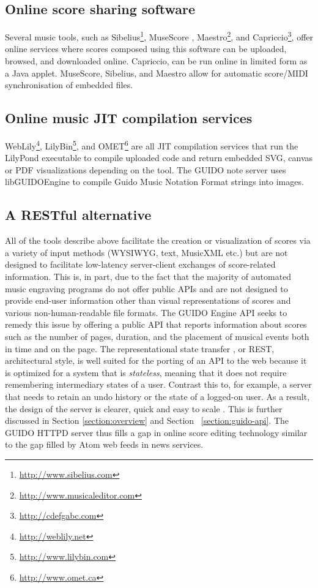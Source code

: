 \documentclass[11pt,a4paper]{article}
\newcommand{\footurl}[1]	{\footnote{\url{#1}}}
\begin{document}
\subsection{Online score sharing software}\label{subsection:sharing}
Several music tools, such as Sibelius\footurl{http://www.sibelius.com}, MuseScore \cite{musescore}, Maestro\footurl{http://www.musicaleditor.com}, and Capriccio\footurl{http://cdefgabc.com}, offer online services where scores composed using this software can be uploaded, browsed, and downloaded online.  Capriccio, can be run online in limited form as a Java applet.  MuseScore, Sibelius, and Maestro allow for automatic score/MIDI synchronisation of embedded files.
\subsection{Online music JIT compilation services}\label{subsection:jit}
WebLily\footurl{http://weblily.net}, LilyBin\footurl{http://www.lilybin.com}, and OMET\footurl{http://www.omet.ca} are all JIT compilation services that run the LilyPond executable to compile uploaded code and return embedded SVG, canvas or PDF visualizations depending on the tool.  The GUIDO note server \cite{renz98} uses libGUIDOEngine to compile Guido Music Notation Format \cite{hoos98} strings into images.
\subsection{A RESTful alternative}\label{subsection:restful}

All of the tools describe above facilitate the creation or visualization of scores via a variety of input methods (WYSIWYG, text, MusicXML etc.) but are not designed to facilitate low-latency server-client exchanges of score-related information.  This is, in part, due to the fact that the majority of automated music engraving programs do not offer public APIs and are not designed to provide end-user information other than visual representations of scores and various non-human-readable file formats.  The GUIDO Engine API \cite{Dau09a}\cite{guidolib1.52} seeks to remedy this issue by offering a public API that reports information about scores such as the number of pages, duration, and the placement of musical events both in time and on the page.  The representational state transfer \cite{Fielding00}, or REST, architectural style, is well suited for the porting of an API to the web because it is optimized for a system that is \emph{stateless}, meaning that it does not require remembering intermediary states of a user.  Contrast this to, for example, a server that needs to retain an undo history or the state of a logged-on user.  As a result, the design of the server is clearer, quick and easy to scale \cite{richardson2008restful}.  This is further discussed in Section \ref{section:overview} and Section ~\ref{section:guido-api}.  The GUIDO HTTPD server thus fills a gap in online score editing technology similar to the gap filled by Atom web feeds in news services.
\end{document}
